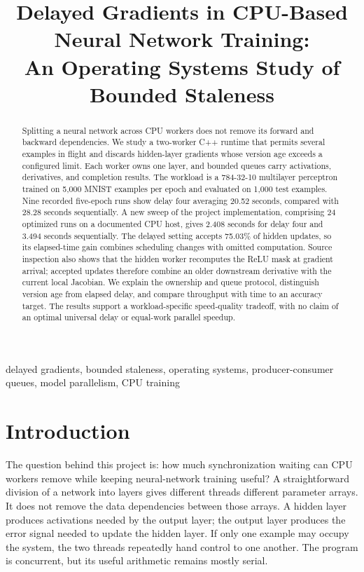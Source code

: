 \documentclass[conference]{IEEEtran}
\title{Delayed Gradients in CPU-Based Neural Network Training:\\An Operating Systems Study of Bounded Staleness}
\author{\IEEEauthorblockN{Kaustubh Upadhya, Dhruv Pekhale, Jeet Mahajan, Tejas Tandon}
\IEEEauthorblockA{Indian Institute of Information Technology, Sri City\\Operating Systems Course Project}}
\begin{document}
\maketitle
\begin{abstract}
Splitting a neural network across CPU workers does not remove its forward and backward dependencies. We study a two-worker C++ runtime that permits several examples in flight and discards hidden-layer gradients whose version age exceeds a configured limit. Each worker owns one layer, and bounded queues carry activations, derivatives, and completion results. The workload is a 784-32-10 multilayer perceptron trained on 5,000 MNIST examples per epoch and evaluated on 1,000 test examples. Nine recorded five-epoch runs show delay four averaging 20.52 seconds, compared with 28.28 seconds sequentially. A new sweep of the project implementation, comprising 24 optimized runs on a documented CPU host, gives 2.408 seconds for delay four and 3.494 seconds sequentially. The delayed setting accepts 75.03\% of hidden updates, so its elapsed-time gain combines scheduling changes with omitted computation. Source inspection also shows that the hidden worker recomputes the ReLU mask at gradient arrival; accepted updates therefore combine an older downstream derivative with the current local Jacobian. We explain the ownership and queue protocol, distinguish version age from elapsed delay, and compare throughput with time to an accuracy target. The results support a workload-specific speed-quality tradeoff, with no claim of an optimal universal delay or equal-work parallel speedup.

\end{abstract}
\begin{IEEEkeywords}
delayed gradients, bounded staleness, operating systems, producer-consumer queues, model parallelism, CPU training
\end{IEEEkeywords}

\section{Introduction}
The question behind this project is: how much synchronization waiting can CPU workers remove while keeping neural-network training useful? A straightforward division of a network into layers gives different threads different parameter arrays. It does not remove the data dependencies between those arrays. A hidden layer produces activations needed by the output layer; the output layer produces the error signal needed to update the hidden layer. If only one example may occupy the system, the two threads repeatedly hand control to one another. The program is concurrent, but its useful arithmetic remains mostly serial.
\end{document}
